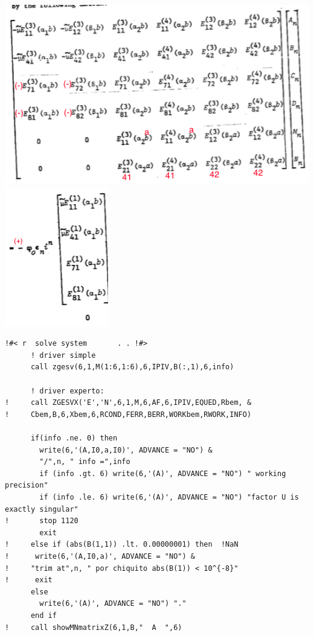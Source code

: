 \documentclass [11pt,spanish]{article}
\begin{document}
\endgroup
\includegraphics[scale=0.6]{matriz}
\includegraphics[scale=0.6]{termindep}
\begingroup
\fontsize{10pt}{12pt}
\selectfont
{}
\begin{shaded}
\begin{verbatim}
!#< r  solve system       . . !#>
      ! driver simple
      call zgesv(6,1,M(1:6,1:6),6,IPIV,B(:,1),6,info)
      
      ! driver experto:
!     call ZGESVX('E','N',6,1,M,6,AF,6,IPIV,EQUED,Rbem, &
!     Cbem,B,6,Xbem,6,RCOND,FERR,BERR,WORKbem,RWORK,INFO)
      
      if(info .ne. 0) then
        write(6,'(A,I0,a,I0)', ADVANCE = "NO") &
        "/",n, " info =",info
        if (info .gt. 6) write(6,'(A)', ADVANCE = "NO") " working precision"
        if (info .le. 6) write(6,'(A)', ADVANCE = "NO") "factor U is exactly singular"
!       stop 1120
        exit
!     else if (abs(B(1,1)) .lt. 0.00000001) then  !NaN
!      write(6,'(A,I0,a)', ADVANCE = "NO") &
!     "trim at",n, " por chiquito abs(B(1)) < 10^{-8}"
!      exit
      else
        write(6,'(A)', ADVANCE = "NO") "."
      end if
!     call showMNmatrixZ(6,1,B,"  A  ",6)     
\end{verbatim}
\end{shaded}
\endgroup
\end{document}
